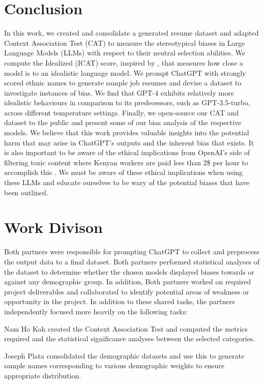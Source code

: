 \documentclass{article}
\begin{document}
\section{Conclusion}
In this work, we created and consolidate a generated resume dataset and adapted Context Association Test (CAT) to measure the stereotypical biases in Large Language Models (LLMs) with respect to their neutral selection abilities. We compute the Idealized (ICAT) score, inspired by \cite{nadeem2020stereoset}, that measures how close a model is to an idealistic language model. We prompt ChatGPT with strongly scored ethnic names to generate sample job resumes and devise a dataset to investigate instances of bias. We find that GPT-4 exhibits relatively more idealistic behaviours in comparison to its predecessors, such as GPT-3.5-turbo, across different temperature settings. Finally, we open-source our CAT and dataset to the public and present some of our bias analysis of the respective models. We believe that this work provides valuable insights into the potential harm that may arise in ChatGPT's outputs and the inherent bias that exists. It is also important to be aware of the ethical implications from OpenAI's side of filtering toxic content where Kenyan workers are paid less than 2\$ per hour to accomplish this 
\cite{time6247678}. We must be aware of these ethical implications when using these LLMs and educate ourselves to be wary of the potential biases that have been outlined. 


\section{Work Divison}
Both partners were responsible for prompting ChatGPT to collect and preprocess the output data to a final dataset. Both partners performed statistical analyses of the dataset to determine whether the chosen models displayed biases towards or against any demographic group. In addition, Both partners worked on required project deliverables and collaborated to identify potential areas of weakness or opportunity in the project. In addition to these shared tasks, the partners independently focused more heavily on the following tasks:

Nam Ho Koh created the Context Association Test and computed the metrics required and the statistical significance analyses between the selected categories. 

Joseph Plata consolidated the demographic datasets and use this to generate sample names corresponding to various demographic weights to ensure appropriate distribution.
\end{document}
